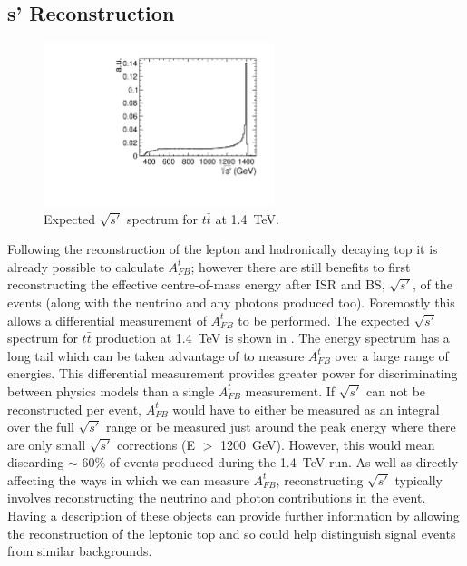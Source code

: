 \subsection{s' Reconstruction}
\label{sec:sprime}
\begin{figure}
  \centering
  \includegraphics[width=0.6\textwidth]{TopAnalysis/figures/GeneratorSPrime.pdf}
  \caption[Expected $\sqrt{s'}$ spectrum for $t\bar{t}$ at 1.4~TeV]{Expected $\sqrt{s'}$ spectrum for $t\bar{t}$ at 1.4~TeV.}
  \label{fig:trueSPrime}
\end{figure}

Following the reconstruction of the lepton and hadronically decaying top it is already possible to calculate $A_{FB}^{t}$; however there are still benefits to first reconstructing the effective centre-of-mass energy after \ac{ISR} and \ac{BS}, $\sqrt{s'}$, of the events (along with the neutrino and any photons produced too). Foremostly this allows a differential measurement of $A_{FB}^{t}$ to be performed. The expected $\sqrt{s'}$ spectrum for $t\bar{t}$ production at 1.4~TeV is shown in . The energy spectrum has a long tail which can be taken advantage of to measure $A_{FB}^{t}$ over a large range of energies. This differential measurement provides greater power for discriminating between physics models than a single $A_{FB}^{t}$ measurement. If $\sqrt{s'}$ can not be reconstructed per event, $A_{FB}^{t}$ would have to either be measured as an integral over the full $\sqrt{s'}$ range or be measured just around the peak energy where there are only small $\sqrt{s'}$ corrections (E $>$ 1200~GeV). However, this would mean discarding $\sim$ 60\% of events produced during the 1.4~TeV run. As well as directly affecting the ways in which we can measure $A_{FB}^{t}$, reconstructing $\sqrt{s'}$ typically involves reconstructing the neutrino and photon contributions in the event. Having a description of these objects can provide further information by allowing the reconstruction of the leptonic top and so could help distinguish signal events from similar backgrounds.

